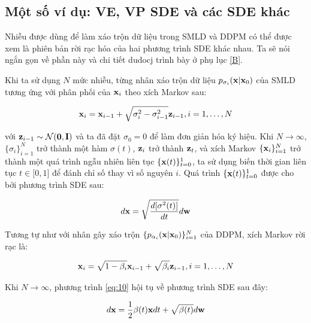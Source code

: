 \documentclass{article} %
\begin{document}
\subsection{Một số ví dụ: VE, VP SDE và các SDE khác}

Nhiễu được dùng để làm xáo trộn dữ liệu trong SMLD và DDPM có thể được xem là phiên bản rời rạc hóa của hai phương trình SDE khác nhau.
Ta sẽ nói ngắn gọn về phần này và chi tiết dudocj trình bày ở phụ lục \ref{B}.

Khi ta sử dụng $N$ mức nhiễu, từng nhân xáo trộn dữ liệu $p_{\sigma_i}(\bold{x} \vert \bold{x}_0)$ của SMLD tương ứng với phân phối của $\bold{x}_i$ theo xích Markov sau:

\begin{equation}
    \bold{x}_i = \bold{x}_{i-1} + \sqrt{\sigma_i^2 - \sigma_{i-1}^2} \bold{z}_{i-1}, i=1, \dots, N
\end{equation}

với $\bold{z}_{i-1} \sim \mathcal{N}(\bold{0}, \bold{I})$ và ta đã đặt $\sigma_0=0$ để làm đơn giản hóa ký hiệu.
Khi $N \rightarrow \infty$, $\lbrace \sigma_i \rbrace_{i=1}^N$ trở thành một hàm $\sigma(t)$, $\bold{z}_i$ trở thành $\bold{z}_t$, và xích Markov $\lbrace \bold{x}_i \rbrace_{i=1}^N$ trở thành một quá trình ngẫu nhiên liên tục $\lbrace \bold{x}(t) \rbrace_{t=0}^1$, ta sử dụng biến thời gian liên tục $t \in \lbrack 0, 1 \rbrack$ để đánh chỉ số thay vì số nguyên $i$.
Quá trình $\lbrace \bold{x}(t) \rbrace_{t=0}^1$ được cho bởi phương trình SDE sau:

\begin{equation} \label{eq:9}
    d \bold{x} = \sqrt{\dfrac{d \lbrack \sigma^2(t) \rbrack}{dt}} d \bold{w}
\end{equation}

Tương tự như với nhân gây xáo trộn $\lbrace p_{\alpha_i} (\bold{x} \vert \bold{x}_0) \rbrace_{i=1}^N$ của DDPM, xích Markov rời rạc là:

\begin{equation} \label{eq:10}
    \bold{x}_i = \sqrt{1 - \beta_i} \bold{x}_{i-1} + \sqrt{\beta_i} \bold{z}_{i-1}, i=1,\dots,N
\end{equation}

Khi $N \rightarrow \infty$, phương trình \ref{eq:10} hội tụ về phương trình SDE sau đây:

\begin{equation} \label{eq:11}
    d \bold{x} = \dfrac{1}{2} \beta(t) \bold{x} dt + \sqrt{\beta(t)} d\bold{w}
\end{equation}
\end{document}
